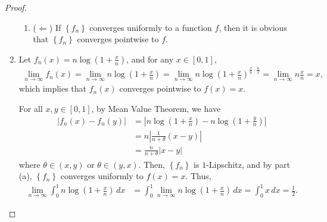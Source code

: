 \documentclass[11pt]{article}
\theoremstyle{definition}
\numberwithin{equation}{subsection}
\begin{document}
\begin{proof}
\begin{enumerate}[label=(\alph*)]
\begin{enumerate}[label=\arabic*)]
        \item ($\Leftarrow$) If $\left\{f_n\right\}$ converges uniformly to a function $f$, then it is obvious that $\left\{f_n\right\}$ converges pointwise to $f$.
    \end{enumerate}
    
    \item Let $f_n(x) = n \log \left(1 + \frac{x}{n}\right)$, and for any $x \in [0,1]$,
    \begin{align*}
        \lim_{n \to \infty} f_n(x) = \lim_{n \to \infty} n \log \left(1 + \frac{x}{n}\right) = \lim_{n \to \infty} n \log \left(1 + \frac{x}{n}\right)^{\frac{x}{n} \cdot \frac{n}{x}} = \lim_{n \to \infty} n \frac{x}{n} = x,
    \end{align*}
    which implies that $f_n(x)$ converges pointwise to $f(x) = x$. 
    
    For all $x , y \in [0,1]$, by Mean Value Theorem, we have
    \begin{align*}
        |f_n(x) - f_n(y)| & = \left|n \log \left(1 + \frac{x}{n}\right) - n \log \left(1 + \frac{y}{n}\right) \right| \\
        & = n \left| \frac{1}{n + \theta} (x - y) \right| \\
        & = \frac{n}{n + \theta} |x - y|
    \end{align*}
    where $\theta \in (x,y)$ or $\theta \in (y,x)$. Then, $\left\{f_n\right\}$ is $1$-Lipschitz, and by part (a), $\left\{f_n\right\}$ converges uniformly to $f(x) = x$. Thus,
    \begin{align*}
        \lim_{n \to \infty} \int^1_0 n \log \left(1 + \frac{x}{n}\right)\, dx & =  \int^1_0 \lim_{n \to \infty} n \log \left(1 + \frac{x}{n}\right)\, dx = \int^1_0 x \, dx = \frac{1}{2}.
    \end{align*}
\end{enumerate}
\end{proof}

\medskip
\end{document}
